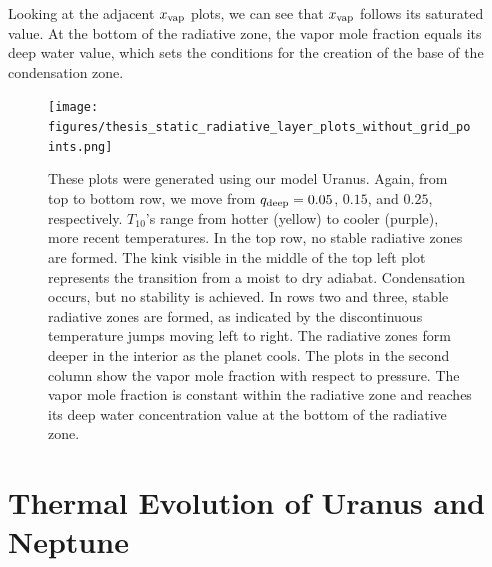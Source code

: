 \documentclass[11pt]{ucscthesisbs}
\begin{document}
Looking at the adjacent $x_{\rm vap}$ plots, we can see that $x_{\rm vap}$ follows its saturated value. At the bottom of the radiative zone, the vapor mole fraction equals its deep water value, which sets the conditions for the creation of the base of the condensation zone. 

\begin{figure}[ht]
 \centerline{
  \texttt{[image: figures/thesis\_static\_radiative\_layer\_plots\_without\_grid\_points.png]}
 }
\caption[Formation of Radiative Zone]
{These plots were generated using our model Uranus. Again, from top to bottom row, we move from $q_{\rm deep} = 0.05$, $0.15$, and $0.25$, respectively. $T_{10}$'s range from hotter (yellow) to cooler (purple), more recent temperatures. In the top row, no stable radiative zones are formed. The kink visible in the middle of the top left plot represents the transition from a moist to dry adiabat. Condensation occurs, but no stability is achieved. In rows two and three, stable radiative zones are formed, as indicated by the discontinuous temperature jumps moving left to right. The radiative zones form deeper in the interior as the planet cools. The plots in the second column show the vapor mole fraction with respect to pressure. The vapor mole fraction is constant within the radiative zone and reaches its deep water concentration value at the bottom of the radiative zone. }
\label{fig:radiative}
\end{figure}


\section{Thermal Evolution of Uranus and Neptune}
\end{document}
